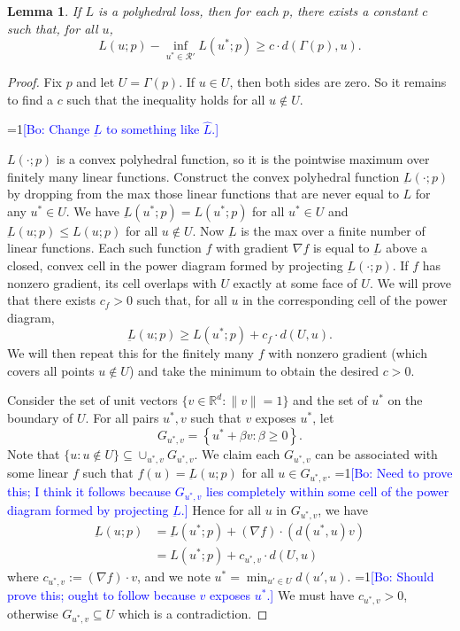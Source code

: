 \documentclass{article}
\newcommand{\Comments}{1}
\newcommand{\mynote}[2]{\ifnum\Comments=1\textcolor{#1}{#2}\fi}
\newcommand{\bo}[1]{\mynote{blue}{[Bo: #1]}}
\newcommand{\reals}{\mathbb{R}}
\newcommand{\R}{\mathcal{R}}
\newtheorem{lemma}{Lemma}
\theoremstyle{definition}
\begin{document}
\begin{lemma} \label{lemma:distance-loss}
  If $L$ is a polyhedral loss, then for each $p$, there exists a constant $c$ such that, for all $u$,
    \[ L(u;p) - \inf_{u^* \in \R'} L(u^*;p) \geq c \cdot d(\Gamma(p),u) . \]
\end{lemma}
\begin{proof}
  Fix $p$ and let $U = \Gamma(p)$.
  If $u \in U$, then both sides are zero.
  So it remains to find a $c$ such that the inequality holds for all $u \not\in U$.

  \bo{Change $\underbar{L}$ to something like $\hat{L}$.}
  
  $L(\cdot;p)$ is a convex polyhedral function, so it is the pointwise maximum over finitely many linear functions.
  Construct the convex polyhedral function $\underbar{L}(\cdot;p)$ by dropping from the max those linear functions that are never equal to $L$ for any $u^* \in U$.
  We have $\underbar{L}(u^*;p) = L(u^*;p)$ for all $u^* \in U$ and $\underbar{L}(u;p) \leq L(u;p)$ for all $u \not\in U$.
  Now $\underbar{L}$ is the max over a finite number of linear functions.
  Each such function $f$ with gradient $\nabla f$ is equal to $\underbar{L}$ above a closed, convex cell in the power diagram formed by projecting $\underbar{L}(\cdot;p)$.
  If $f$ has nonzero gradient, its cell overlaps with $U$ exactly at some face of $U$.
  We will prove that there exists $c_f > 0$ such that, for all $u$ in the corresponding cell of the power diagram,
    \[ \underbar{L}(u;p) \geq L(u^*;p) + c_f \cdot d(U,u) . \]
  We will then repeat this for the finitely many $f$ with nonzero gradient (which covers all points $u \not\in U$) and take the minimum to obtain the desired $c > 0$.

  Consider the set of unit vectors $\{v \in \reals^d : \|v\|=1\}$ and the set of $u^*$ on the boundary of $U$.
  For all pairs $u^*,v$ such that $v$ exposes $u^*$, let
    \[ G_{u^*,v} = \left\{ u^* + \beta v : \beta \geq 0 \right\} . \]
  Note that $\{ u : u \not\in U\} \subseteq \cup_{u^*,v} G_{u^*,v}$.
  We claim each $G_{u^*,v}$ can be associated with some linear $f$ such that $f(u) = \underbar{L}(u;p)$ for all $u \in G_{u^*,v}$.
  \bo{Need to prove this; I think it follows because $G_{u^*,v}$ lies completely within some cell of the power diagram formed by projecting $\underbar{L}$.}
  Hence for all $u$ in $G_{u^*,v}$, we have
  \begin{align*}
    \underbar{L}(u;p) &= \underbar{L}(u^*;p) + (\nabla f) \cdot (d(u^*,u) v)  \\
                      &= L(u^*;p) + c_{u^*,v} \cdot d(U,u)
  \end{align*}
  where $c_{u^*,v} := (\nabla f) \cdot v$, and we note $u^* = \min_{u' \in U} d(u',u)$. \bo{Should prove this; ought to follow because $v$ exposes $u^*$.}
  We must have $c_{u^*,v} > 0$, otherwise $G_{u^*,v} \subseteq U$ which is a contradiction.
  

\end{proof}
\end{document}
